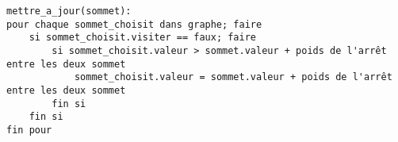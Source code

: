 			\begin{lstlisting}
mettre_a_jour(sommet):
pour chaque sommet_choisit dans graphe; faire
	si sommet_choisit.visiter == faux; faire
		si sommet_choisit.valeur > sommet.valeur + poids de l'arrêt entre les deux sommet
			sommet_choisit.valeur = sommet.valeur + poids de l'arrêt entre les deux sommet
		fin si
	fin si
fin pour
			\end{lstlisting}

